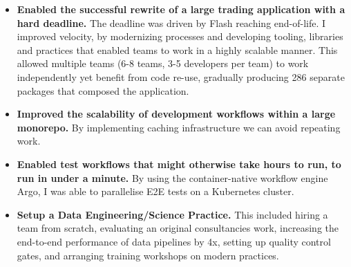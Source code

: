 \documentclass[10pt,a4paper]{article}
\begin{document}
\begin{indentsection}
\item
\begin{itemize}[leftmargin=0cm]

    \item \textbf{Enabled the successful rewrite of a large trading application with a hard deadline.} The deadline was driven by Flash reaching end-of-life. I improved velocity, by modernizing processes and developing tooling, libraries and practices that enabled teams to work in a highly scalable manner. This allowed multiple teams (6-8 teams, 3-5 developers per team) to work independently yet benefit from code re-use, gradually producing 286 separate packages that composed the application.

    \item \textbf{Improved the scalability of development workflows within a large monorepo.} By implementing caching infrastructure we can avoid repeating work.

    \item \textbf{Enabled test workflows that might otherwise take hours to run, to run in under a minute.} By using the container-native workflow engine Argo, I was able to parallelise E2E tests on a Kubernetes cluster.

    \item \textbf{Setup a Data Engineering/Science Practice.} This included hiring a team from scratch, evaluating an original consultancies work, increasing the end-to-end performance of data pipelines by 4x, setting up quality control gates, and arranging training workshops on modern practices.

\end{itemize}
\end{indentsection}

\end{document}
